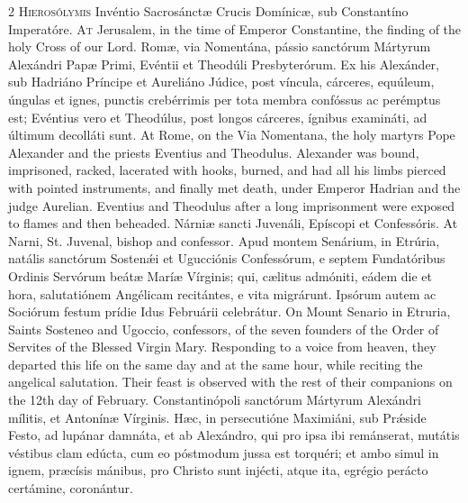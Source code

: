 \begin{paracol}{2}
\lettrine[lines=2]{H}{ierosólymis} Invéntio 
 Sacrosánctæ Crucis Domínicæ, sub Constantíno Imperatóre.
\switchcolumn
{}
\lettrine[lines=2]{A}{t} Jerusalem, in the time of 
 Emperor Constantine, the finding of the holy Cross of our Lord.
\switchcolumn*
{}
Romæ, via Nomentána, 
 pássio sanctórum Mártyrum Alexándri Papæ Primi, Evéntii et Theodúli 
 Presbyterórum. Ex his Alexánder, sub Hadriáno Príncipe et Aureliáno 
 Júdice, post víncula, cárceres, equúleum, úngulas et ignes, punctis 
 crebérrimis per tota membra confóssus ac perémptus est; Evéntius vero et 
 Theodúlus, post longos cárceres, ígnibus examináti, ad 
 últimum decolláti 
 sunt.
\switchcolumn
{}
At Rome, on the Via Nomentana, the 
 holy martyrs Pope Alexander and the priests Eventius and Theodulus. 
 Alexander was bound, imprisoned, racked, lacerated with hooks, burned, and 
 had all his limbs pierced with pointed instruments, and finally met death, 
 under Emperor Hadrian and the judge Aurelian. Eventius and Theodulus 
 after a long imprisonment were exposed to flames and then beheaded.
\switchcolumn*
{}
Nárniæ sancti Juvenáli, 
 Epíscopi et Confessóris.
\switchcolumn
{}
At Narni, St. Juvenal, bishop and 
 confessor.
\switchcolumn*
{}
Apud montem Senárium, 
 in Etrúria, natális sanctórum Sostenǽi et Ugucciónis Confessórum, e septem 
 Fundatóribus Ordinis Servórum beátæ Maríæ Vírginis; qui, cælitus admóniti, 
 eádem die et hora, salutatiónem Angélicam recitántes, e vita migrárunt. 
 Ipsórum autem ac Sociórum festum prídie Idus Februárii celebrátur.
\switchcolumn
{}
On Mount Senario in Etruria, Saints 
 Sosteneo and Ugoccio, confessors, of the seven founders of the Order of 
 Servites of the Blessed Virgin Mary. Responding to a voice from 
 heaven, they departed this life on the same day and at the same hour, while 
 reciting the angelical salutation. Their feast is observed with the 
 rest of their companions on the 12th day of February.
\switchcolumn*
{}
Constantinópoli 
 sanctórum Mártyrum Alexándri mílitis, et Antonínæ Vírginis. Hæc, in 
 persecutióne Maximiáni, sub Prǽside Festo, ad lupánar damnáta, et ab 
 Alexándro, qui pro ipsa ibi remánserat, mutátis véstibus clam edúcta, cum eo 
 póstmodum jussa est torquéri; et ambo simul in ignem, præcísis mánibus, pro 
 Christo sunt injécti, atque ita, egrégio perácto certámine, coronántur.
\switchcolumn

\end{paracol}
